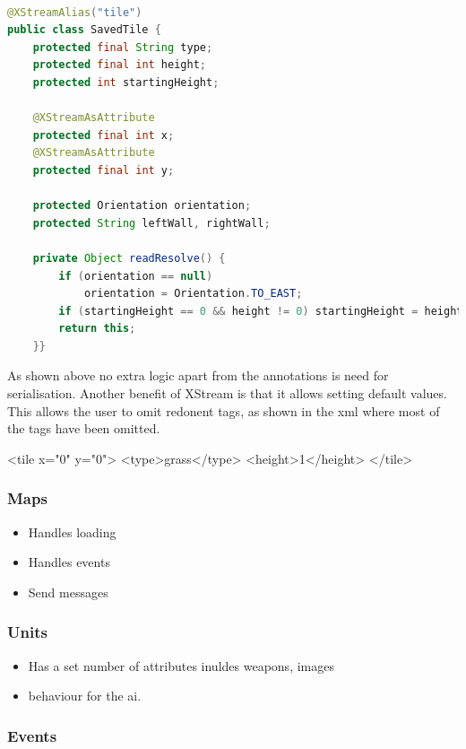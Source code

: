 \begin{lstlisting}[caption=Example of class that is serialisable with XStream, label=lst:xstream, language=java] %Java
	
@XStreamAlias("tile")
public class SavedTile {
	protected final String type;
	protected final int height; 
	protected int startingHeight;
	
	@XStreamAsAttribute
	protected final int x;
	@XStreamAsAttribute
	protected final int y;

	protected Orientation orientation;
	protected String leftWall, rightWall;
	
	private Object readResolve() {
		if (orientation == null)  
			orientation = Orientation.TO_EAST;
		if (startingHeight == 0 && height != 0) startingHeight = height;
		return this;
	}}
\end{lstlisting}
As shown above no extra logic apart from the annotations is need for serialisation.  Another benefit of XStream is that it allows setting default values. This allows the user to omit redonent tags, as shown in the xml where most of the tags have been omitted.
\begin{lst:tile}[caption=Serialised form of the above class. ]
<tile x="0" y="0">
	<type>grass</type>
	<height>1</height>
</tile>
\end{lst:tile}


\subsubsection{Maps}
\label{ssub:maps}

\begin{itemize}
	\item Handles loading
	\item Handles events
	\item Send messages
\end{itemize}

\subsubsection{Units}
\label{ssub:units}

\begin{itemize}
	\item Has a set number of attributes inuldes weapons, images
	\item behaviour for the ai.  
\end{itemize}

\subsubsection{Events}
\label{ssub:events}

